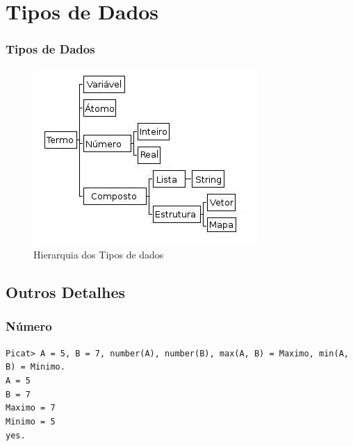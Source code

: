 \documentclass[10pt]{beamer}
\begin{document}

\section{Tipos de Dados}

\begin{frame}
\frametitle{Tipos de Dados}
\begin{figure}[!ht]
\centering
\includegraphics[width=.6\textwidth]{figures/tipos_dados_picat_traduzido.jpg}
\caption{Hierarquia dos Tipos de dados}
\label{Hiera}
\end{figure}
\end{frame}


\subsection{Outros Detalhes}
\begin{frame}
    \frametitle{Número}
    \texttt{Picat> A = 5, B = 7, number(A), number(B),
    max(A, B) = Maximo, min(A, B) = Minimo.}\\
  
    \texttt{A = 5}\\
    \texttt{B = 7}\\
    \texttt{Maximo = 7}\\
    \texttt{Minimo = 5}\\
    \texttt{yes.}
\end{frame}



\end{document}
